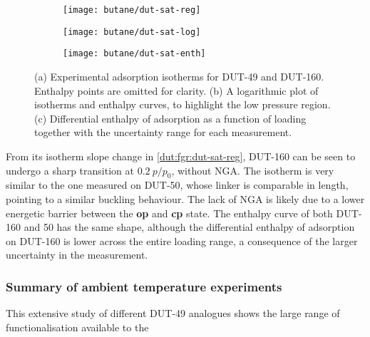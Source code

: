 \begin{figure}[htb]
    \centering
    \begin{subfigure}{0.33\linewidth}
        \texttt{[image: butane/dut-sat-reg]}%
        \caption{}\label{dut:fgr:dut-sat-reg}
    \end{subfigure}%
    \begin{subfigure}{0.33\linewidth}
        \texttt{[image: butane/dut-sat-log]}%
        \caption{}\label{dut:fgr:dut-sat-log}
    \end{subfigure}%
    \begin{subfigure}{0.33\linewidth}
        \texttt{[image: butane/dut-sat-enth]}%
        \caption{}\label{dut:fgr:dut-sat-enth}
    \end{subfigure}%
    \caption{(a) Experimental adsorption isotherms for DUT-49 and 
    DUT-160. Enthalpy points are omitted for clarity. 
    (b) A logarithmic plot of isotherms and enthalpy curves,
    to highlight the low pressure region. 
    (c) Differential enthalpy of adsorption as a function of loading
    together with the uncertainty range for each measurement.}%
    \label{dut:fgr:dut-sat}
\end{figure}

From its isotherm slope change in \autoref{dut:fgr:dut-sat-reg},
DUT-160 can be seen to undergo a sharp transition at 
\(0.2~p/p_0\), without NGA. The isotherm is very similar to the one
measured on DUT-50, whose linker is comparable in length, pointing to 
a similar buckling behaviour. The lack of NGA is likely due to 
a lower energetic barrier between the \textbf{op} and \textbf{cp}
state. The enthalpy curve of both DUT-160 and 50 has the same 
shape, although the differential enthalpy of adsorption on 
DUT-160 is lower across the entire loading range, a consequence of the
larger uncertainty in the measurement.

\subsubsection{Summary of ambient temperature experiments}

This extensive study of different DUT-49 analogues shows the 
large range of functionalisation available to the 